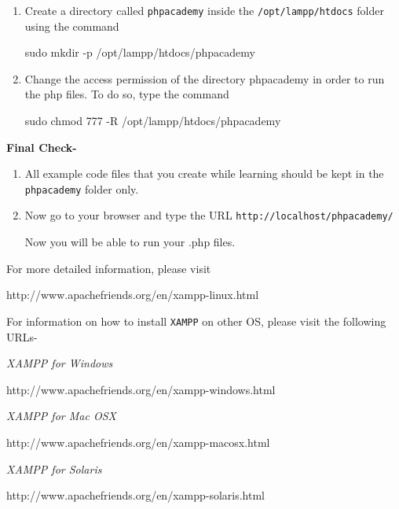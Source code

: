 \documentclass[11pt]{article}
\newenvironment{enumcpt}{\begin{enumerate} \topsep 0pt \partopsep 0pt 
                        \parsep 0pt
                        \itemsep 0pt \leftmargin -1in \rightmargin 0pt
                        }{\end{enumerate}}
\begin{document}
\begin{multicols}{2}
\begin{enumcpt}
{\tt http://localhost}

You will see {\tt http://localhost/xampp} in your web browser URL.  This shows that the Apache server is running.

\item Create a directory called {\tt phpacademy} inside the 
{\tt /opt/lampp/htdocs} folder using the command 

{\tiny sudo mkdir -p /opt/lampp/htdocs/phpacademy}

\item Change the access permission of the directory phpacademy in order to run the php files.  To do so, type the command 

{\tiny sudo chmod 777 -R /opt/lampp/htdocs/phpacademy}
\end{enumcpt}



\textbf {Final Check-}
\begin{enumcpt}
\item All example code files that you create while learning should be kept in the {\tt phpacademy} folder only.

\item Now go to your browser and type the URL 
{\tt http://localhost/phpacademy/}

Now you will be able to run your .php files.  
\end{enumcpt}
For more detailed information, please visit

{\tiny http://www.apachefriends.org/en/xampp-linux.html}


For information on how to install {\tt XAMPP} on other OS, please visit the following URLs-

\emph {XAMPP for Windows}

{\tiny http://www.apachefriends.org/en/xampp-windows.html}

\emph {XAMPP for Mac OSX}

{\tiny http://www.apachefriends.org/en/xampp-macosx.html}

\emph {XAMPP for Solaris}

{\tiny http://www.apachefriends.org/en/xampp-solaris.html}

\end{multicols}
\end{document}

